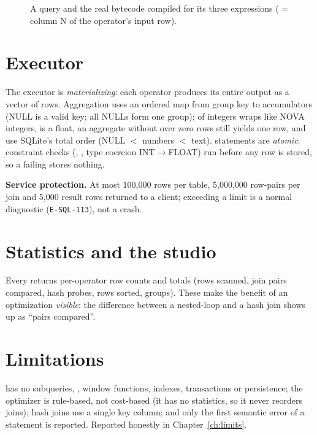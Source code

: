 \begin{figure}[H]
\begin{minipage}[t]{0.40\textwidth}\begingroup\lstset{style=tiny}\endgroup\end{minipage}\hfill
\begin{minipage}[t]{0.56\textwidth}\begingroup\lstset{style=tiny}\endgroup\end{minipage}
\caption{A query and the real bytecode compiled for its three expressions ( = column N of the operator's input row).}
\end{figure}

\section{Executor}
The executor is \emph{materializing}: each operator produces its entire output as a vector of rows. Aggregation uses an ordered map from group key to accumulators (NULL is a valid key; all NULLs form one group);  of integers wraps like NOVA integers,  is a float, an aggregate without  over zero rows still yields one row, and  use SQLite's total order (NULL $<$ numbers $<$ text).  statements are \emph{atomic}: constraint checks (, , type coercion INT$\to$FLOAT) run before any row is stored, so a failing  stores nothing.

\textbf{Service protection.} At most 100{,}000 rows per table, 5{,}000{,}000 row-pairs per join and 5{,}000 result rows returned to a client; exceeding a limit is a normal diagnostic (\texttt{E-SQL-113}), not a crash.

\section{Statistics and the studio}
Every  returns per-operator row counts and totals (rows scanned, join pairs compared, hash probes, rows sorted, groups). These make the benefit of an optimization \emph{visible}: the difference between a nested-loop and a hash join shows up as ``pairs compared''.


\section{Limitations}
\begin{warnbox}
\novasql{} has no subqueries, , window functions, indexes, transactions or persistence; the optimizer is rule-based, not cost-based (it has no statistics, so it never reorders joins); hash joins use a single key column; and only the first semantic error of a statement is reported. Reported honestly in Chapter~\ref{ch:limits}.
\end{warnbox}
